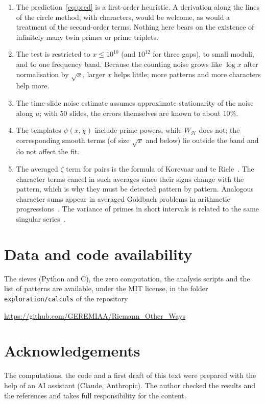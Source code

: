 \documentclass[11pt]{amsart}
\theoremstyle{remark}
\newcommand{\cH}{\mathcal{H}}
\begin{document}
\begin{enumerate}
\item The prediction~\eqref{eq:pred} is a first-order heuristic. A derivation along the lines of the circle method, with characters, would be welcome, as would a treatment of the second-order terms. Nothing here bears on the existence of infinitely many twin primes or prime triplets.
\item The test is restricted to $x\le10^{10}$ (and $10^{12}$ for three gaps), to small moduli, and to one frequency band. Because the counting noise grows like $\log x$ after normalisation by $\sqrt x$, larger $x$ helps little; more patterns and more characters help more.
\item The time-slide noise estimate assumes approximate stationarity of the noise along $u$; with $50$ slides, the errors themselves are known to about $10\%$.
\item The templates $\psi(x,\chi)$ include prime powers, while $W_\cH$ does not; the corresponding smooth terms (of size $\sqrt x$ and below) lie outside the band and do not affect the fit.
\item The averaged $\zeta$ term for pairs is the formula of Korevaar and te Riele~\cite{KtR}. The character terms cancel in such averages since their signs change with the pattern, which is why they must be detected pattern by pattern. Analogous character sums appear in averaged Goldbach problems in arithmetic progressions~\cite{Suzuki,BHMS}. The variance of primes in short intervals is related to the same singular series~\cite{MS}.
\end{enumerate}

\section*{Data and code availability}
The sieves (Python and C), the zero computation, the analysis scripts and the list of patterns are available, under the MIT license, in the folder \texttt{exploration/calculs} of the repository
\begin{center}\url{https://github.com/GEREMIAA/Riemann_Other_Ways}\end{center}

\section*{Acknowledgements}
The computations, the code and a first draft of this text were prepared with the help of an AI assistant (Claude, Anthropic). The author checked the results and the references and takes full responsibility for the content.
\end{document}
